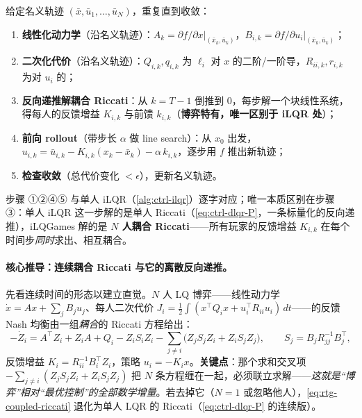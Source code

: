 \begin{algo}\label{alg:rtg-ilqgames}
给定名义轨迹 $(\bar x,\bar u_1,\dots,\bar u_N)$，重复直到收敛：
\begin{enumerate}
  \item \textbf{线性化动力学}（沿名义轨迹）：$A_k=\partial f/\partial x|_{(\bar x_k,\bar u_k)}$，$B_{i,k}=\partial f/\partial u_i|_{(\bar x_k,\bar u_k)}$；
  \item \textbf{二次化代价}（沿名义轨迹）：$Q_{i,k},q_{i,k}$ 为 $\ell_i$ 对 $x$ 的二阶/一阶导，$R_{ii,k},r_{i,k}$ 为对 $u_i$ 的；
  \item \textbf{反向递推解耦合 Riccati}：从 $k=T-1$ 倒推到 $0$，每步解一个块线性系统，得每人的反馈增益 $K_{i,k}$ 与前馈 $k_{i,k}$（\textbf{博弈特有，唯一区别于 iLQR 处}）；
  \item \textbf{前向 rollout}（带步长 $\alpha$ 做 line search）：从 $x_0$ 出发，$u_{i,k}=\bar u_{i,k}-K_{i,k}(x_k-\bar x_k)-\alpha\,k_{i,k}$，逐步用 $f$ 推出新轨迹；
  \item \textbf{检查收敛}（总代价变化 $<\epsilon$），更新名义轨迹。
\end{enumerate}
\end{algo}

\noindent 步骤 ①②④⑤ 与单人 iLQR（\cref{alg:ctrl-ilqr}）逐字对应；唯一本质区别在步骤 ③：单人 iLQR 这一步解的是单人 Riccati（\cref{eq:ctrl-dlqr-P}，一条标量化的反向递推），iLQGames 解的是 \textbf{$N$ 人耦合 Riccati}——所有玩家的反馈增益 $K_{i,k}$ 在每个时间步\emph{同时}求出、相互耦合。

\paragraph{核心推导：连续耦合 Riccati 与它的离散反向递推。}
先看连续时间的形态以建立直觉。$N$ 人 LQ 博弈——线性动力学 $\dot x=Ax+\sum_j B_ju_j$、每人二次代价 $J_i=\tfrac12\int(x^\top Q_ix+u_i^\top R_{ii}u_i)\,dt$——的反馈 Nash 均衡由一组\emph{耦合}的 Riccati 方程给出\cite{basar1999dynamic}：
\begin{equation}
  -\dot Z_i=A^\top Z_i+Z_iA+Q_i-Z_iS_iZ_i-\sum_{j\ne i}\big(Z_jS_jZ_i+Z_iS_jZ_j\big),\qquad S_j=B_jR_{jj}^{-1}B_j^\top,
  \label{eq:rtg-coupled-riccati}
\end{equation}
反馈增益 $K_i=R_{ii}^{-1}B_i^\top Z_i$，策略 $u_i=-K_ix$。\textbf{关键点}：那个求和交叉项 $-\sum_{j\ne i}(Z_jS_jZ_i+Z_iS_jZ_j)$ 把 $N$ 条方程缠在一起，必须联立求解——\emph{这就是“博弈”相对“最优控制”的全部数学增量}。若去掉它（$N=1$ 或忽略他人），\cref{eq:rtg-coupled-riccati} 退化为单人 LQR 的 Riccati（\cref{eq:ctrl-dlqr-P} 的连续版）。

